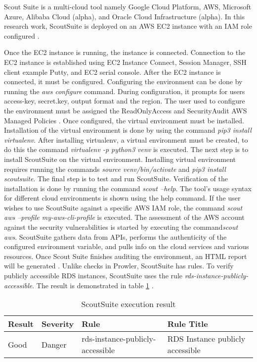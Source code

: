 \par Scout Suite is a multi-cloud tool namely Google Cloud Platform, AWS, Microsoft Azure, Alibaba Cloud (alpha), and
Oracle Cloud Infrastructure (alpha).
In this research work, ScoutSuite is deployed on an AWS EC2 instance with an
IAM role configured \cite{73}.

\par Once the EC2 instance is running, the instance is connected.
Connection to the EC2 instance is established using EC2 Instance Connect, Session Manager, SSH client example Putty, and EC2 serial console.
After the EC2 instance is connected, it must be configured.
Configuring the environment can be done by running the
\textit{aws configure} command.
During configuration, it prompts for users access-key,
secret.key, output format and the region.
The user used to configure the environment must
be assigned the
ReadOnlyAccess and SecurityAudit AWS Managed Policies \cite{76}.
Once configured, the virtual environment must be installed.
Installation of the virtual environment is done by using the command \textit{pip3 install virtualenv}.
After installing virtualenv, a virtual environment must be created, to do this the command \textit{virtualenv -p python3 venv} is executed.
The next step is to install ScoutSuite on the virtual environment.
Installing virtual environment requires running the commands \textit{source venv/bin/activate} and \textit{pip3 install scoutsuite}.
The final step is to test and run ScoutSuite.
Verification of the installation is done by running the command \textit{scout --help}.
The tool's usage syntax for different cloud environments is shown using the help command.
If the user wishes to use ScoutSuite against a specific
AWS IAM role, the command \textit{scout aws --profile my-aws-cli-profile} is executed.
The assessment of the AWS account against the security
vulnerabilities is started by executing the command\textit{scout aws}.
ScoutSuite gathers data from APIs, performs the authenticity of the configured environment variable, and pulls info on the cloud services and various resources.
Once Scout Suite finishes auditing the environment, an HTML report will be generated \cite{77}.
Unlike checks in Prowler, ScoutSuite has rules.
To verify publicly accessible RDS instances, ScoutSuite uses the rule \textit{rds-instance-publicly-accessible}.
The result is demonstrated in table \ref{tab:scoutsuiterule} \cite{77}.

\begin{table}[h!]
    \begin{center}
        \caption{ScoutSuite execution result}
        \label{tab:scoutsuiterule}
        \begin{tabular}{|p{1.4cm}|p{1.7cm}|p{5.0cm}|p{6.0cm}|}
            \hline
            \textbf{Result} & \textbf{Severity} & \textbf{Rule} & \textbf{Rule Title}\\
            \hline
            Good & Danger & rds-instance-publicly-accessible & RDS Instance publicly accessible \\
            \hline
        \end{tabular}
    \end{center}
\end{table}


